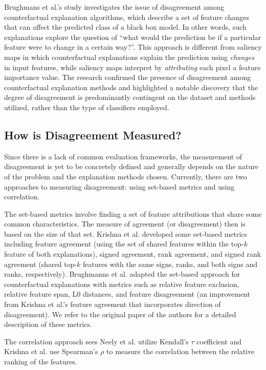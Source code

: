 Brughmans et al.'s study \cite{disagreementCounterfactual} investigates the issue of disagreement among counterfactual explanation algorithms, which describe a set of feature changes that can affect the predicted class of a black box model. In other words, such explanations explore the question of ``what would the prediction be if a particular feature were to change in a certain way?''. This approach is different from saliency maps in which counterfactual explanations explain the prediction using \emph{changes} in input features, while saliency maps interpret by \emph{attributing} each pixel a feature importance value. The research confirmed the presence of disagreement among counterfactual explanation methods and highlighted a notable discovery that the degree of disagreement is predominantly contingent on the dataset and methods utilized, rather than the type of classifiers employed.

\subsection{How is Disagreement Measured?}
\label{subsec:howIsDisagreementMeasured}
Since there is a lack of common evaluation frameworks, the measurement of disagreement is yet to be concretely defined and generally depends on the nature of the problem and the explanation methods chosen. Currently, there are two approaches to measuring disagreement: using set-based metrics and using correlation.

The set-based metrics involve finding a set of feature attributions that share some common characteristics. The measure of agreement (or disagreement) then is based on the size of that set. Krishna et al. \cite{krishna_disagreement_problem} developed some set-based metrics including feature agreement (using the set of shared features within the top-$k$ feature of both explanations), signed agreement, rank agreement, and signed rank agreement (shared top-$k$ features with the same signs, ranks, and both signs and ranks, respectively). Brughmanns et al. \cite{disagreementCounterfactual} adapted the set-based approach for counterfactual explanations with metrics such as relative feature exclusion, relative feature span, L0 distances, and feature disagreement (an improvement from Krishna et al.'s feature agreement that incorporates direction of disagreement). We refer to the original paper of the authors for a detailed description of these metrics.

The correlation approach sees Neely et al. \cite{proneToDisagreement} utilize Kendall's $\tau$ coefficient and Krishna et al. use Spearman's $\rho$ to measure the correlation between the relative ranking of the features.

